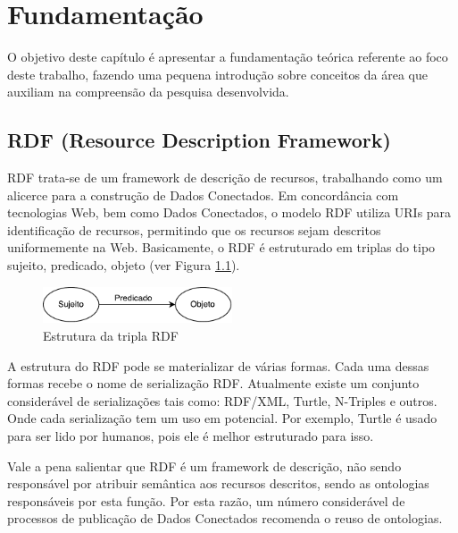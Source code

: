 \chapter{Fundamentação}
\label{cap:fundamentacao}
O objetivo deste capítulo é apresentar a fundamentação teórica referente ao foco deste trabalho, fazendo uma pequena introdução  sobre conceitos da área que auxiliam na compreensão da pesquisa desenvolvida.

\section{RDF (Resource Description Framework)}

RDF trata-se de um framework de descrição de recursos, trabalhando como um alicerce para a construção de Dados Conectados. Em concordância com tecnologias Web, bem como Dados Conectados, o modelo RDF utiliza URIs para identificação de recursos, permitindo que os recursos sejam descritos uniformemente na Web. Basicamente, o RDF é estruturado em triplas do tipo sujeito, predicado, objeto (ver Figura \ref{fig:spo}). 

\begin{figure}[!ht]
	\centering
	\includegraphics[width=0.5\textwidth]{./imagens/Sujeito-predicado-objeto.pdf}
    \caption{Estrutura da tripla RDF}
	\label{fig:spo}
\end{figure}

A estrutura do RDF pode se materializar de várias formas. Cada uma dessas formas recebe o nome de serialização RDF. Atualmente existe um conjunto considerável de serializações tais como: RDF/XML, Turtle, N-Triples e outros. Onde cada serialização tem um uso em potencial. Por exemplo, Turtle é usado para ser lido por humanos, pois ele é melhor estruturado para isso. 

Vale a pena salientar que RDF é um framework de descrição, não sendo responsável por atribuir semântica aos recursos descritos, sendo as ontologias responsáveis por esta função. Por esta razão, um número considerável de processos de publicação de Dados Conectados \cite{bizer2007publish, hyland2011joy, villazon2011methodological, Avila2015} recomenda o reuso de ontologias. 

